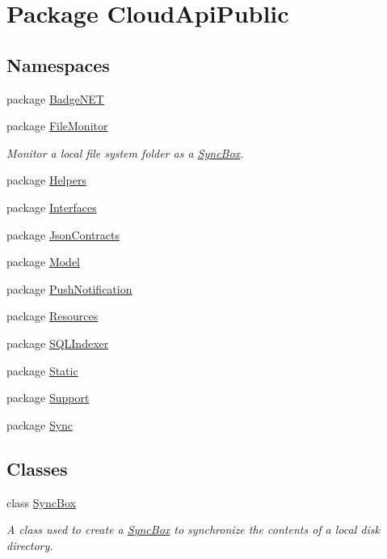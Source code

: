 \hypertarget{namespace_cloud_api_public}{\section{Package Cloud\-Api\-Public}
\label{namespace_cloud_api_public}
}
\subsection*{Namespaces}
\begin{DoxyCompactItemize}
\item 
package \hyperlink{namespace_cloud_api_public_1_1_badge_n_e_t}{Badge\-N\-E\-T}
\item 
package \hyperlink{namespace_cloud_api_public_1_1_file_monitor}{File\-Monitor}
\begin{DoxyCompactList}\small\item\em Monitor a local file system folder as a \hyperlink{class_cloud_api_public_1_1_sync_box}{Sync\-Box}. \end{DoxyCompactList}\item 
package \hyperlink{namespace_cloud_api_public_1_1_helpers}{Helpers}
\item 
package \hyperlink{namespace_cloud_api_public_1_1_interfaces}{Interfaces}
\item 
package \hyperlink{namespace_cloud_api_public_1_1_json_contracts}{Json\-Contracts}
\item 
package \hyperlink{namespace_cloud_api_public_1_1_model}{Model}
\item 
package \hyperlink{namespace_cloud_api_public_1_1_push_notification}{Push\-Notification}
\item 
package \hyperlink{namespace_cloud_api_public_1_1_resources}{Resources}
\item 
package \hyperlink{namespace_cloud_api_public_1_1_s_q_l_indexer}{S\-Q\-L\-Indexer}
\item 
package \hyperlink{namespace_cloud_api_public_1_1_static}{Static}
\item 
package \hyperlink{namespace_cloud_api_public_1_1_support}{Support}
\item 
package \hyperlink{namespace_cloud_api_public_1_1_sync}{Sync}
\end{DoxyCompactItemize}
\subsection*{Classes}
\begin{DoxyCompactItemize}
\item 
class \hyperlink{class_cloud_api_public_1_1_sync_box}{Sync\-Box}
\begin{DoxyCompactList}\small\item\em A class used to create a \hyperlink{class_cloud_api_public_1_1_sync_box}{Sync\-Box} to synchronize the contents of a local disk directory. \end{DoxyCompactList}\end{DoxyCompactItemize}
